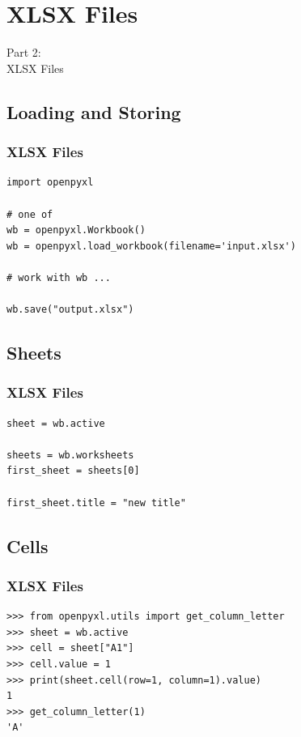 
{
\renewcommand{\bgcolor}{xlsx}

\section{XLSX Files}
\begin{frame}
  \vspace{25mm}
  \begin{center}
    \Huge{Part 2:\\XLSX Files}
  \end{center}
\end{frame}

\subsection{Loading and Storing}
\begin{frame}[fragile]
  \frametitle{XLSX Files }
  \vspace{3mm}
  \begin{verbatim}
import openpyxl

# one of
wb = openpyxl.Workbook()
wb = openpyxl.load_workbook(filename='input.xlsx')

# work with wb ...

wb.save("output.xlsx")
  \end{verbatim}
\end{frame}

\subsection{Sheets}
\begin{frame}[fragile]
  \frametitle{XLSX Files }
  \vspace{3mm}
  \begin{verbatim}
sheet = wb.active

sheets = wb.worksheets
first_sheet = sheets[0]

first_sheet.title = "new title"
  \end{verbatim}
\end{frame}

\subsection{Cells}
\begin{frame}[fragile]
  \frametitle{XLSX Files }
  \vspace{3mm}
  \begin{verbatim}
>>> from openpyxl.utils import get_column_letter
>>> sheet = wb.active
>>> cell = sheet["A1"]
>>> cell.value = 1
>>> print(sheet.cell(row=1, column=1).value)
1
>>> get_column_letter(1)
'A'
  \end{verbatim}
\end{frame}

}
